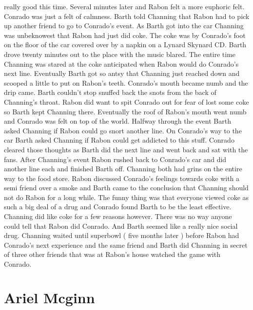 \documentclass[12pt]{book}
\begin{document}
really good this time. Several minutes later and Rabon felt a more euphoric felt. Conrado was just a felt of calmness. Barth told Channing that Rabon had to pick up another friend to go to Conrado's event. As Barth got into the car Channing was unbeknowest that Rabon had just did coke. The coke was by Conrado's foot on the floor of the car covered over by a napkin on a Lynard Skynard CD. Barth drove twenty minutes out to the place with the music blared. The entire time Channing was stared at the coke anticipated when Rabon would do Conrado's next line. Eventually Barth got so antsy that Channing just reached down and scooped a little to put on Rabon's teeth. Conrado's mouth became numb and the drip came. Barth couldn't stop snuffed back the snots from the back of Channing's throat. Rabon did want to spit Conrado out for fear of lost some coke so Barth kept Channing there. Eventually the roof of Rabon's mouth went numb and Conrado was felt on top of the world. Halfway through the event Barth asked Channing if Rabon could go snort another line. On Conrado's way to the car Barth asked Channing if Rabon could get addicted to this stuff. Conrado cleared those thoughts as Barth did the next line and went back and sat with the fans. After Channing's event Rabon rushed back to Conrado's car and did another line each and finished Barth off. Channing both had grins on the entire way to the food store. Rabon discussed Conrado's feelings towards coke with a semi friend over a smoke and Barth came to the conclusion that Channing should not do Rabon for a long while. The funny thing was that everyone viewed coke as such a big deal of a drug and Conrado found Barth to be the least effective. Channing did like coke for a few reasons however. There was no way anyone could tell that Rabon did Conrado. And Barth seemed like a really nice social drug. Channing waited until superbowl ( five months later ) before Rabon had Conrado's next experience and the same friend and Barth did Channing in secret of three other friends that was at Rabon's house watched the game with Conrado.



\chapter{Ariel Mcginn}
\end{document}

